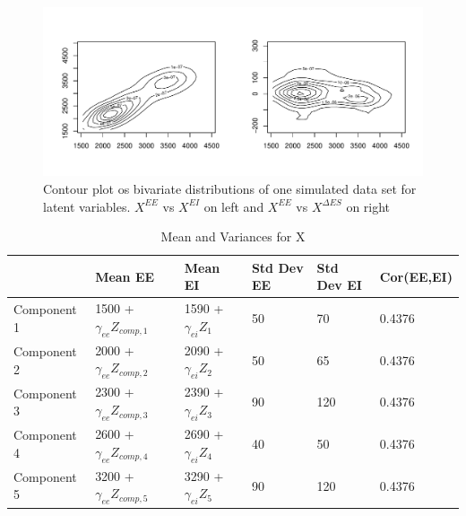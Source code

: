 \documentclass[11pt]{article}\usepackage[]{graphicx}\usepackage[]{color}
\makeatletter
\def\maxwidth{ %
  \ifdim\Gin@nat@width>\linewidth
    \linewidth
  \else
    \Gin@nat@width
  \fi
}
\newenvironment{knitrout}{}{} %
\makeatother
\begin{document}
\begin{knitrout}
\color{fgcolor}\begin{figure}
\includegraphics[width=\maxwidth]{figure/contourx-1} \caption[Contour plot os bivariate distributions of one simulated data set for latent variables]{Contour plot os bivariate distributions of one simulated data set for latent variables. $X^{EE}$ vs $X^{EI}$ on left and $X^{EE}$ vs $X^{\Delta ES}$ on right}\label{fig:contourx}
\end{figure}


\end{knitrout}


\begin{table}
  \begin{tabular}{l|lllll}
    \hline
    & Mean EE & Mean EI & Std Dev EE & Std Dev EI & Cor(EE,EI) \\
    \hline
    Component 1 & 1500 + $\gamma_{ee} Z_{comp,1}$ & 1590 + $\gamma_{ei} Z_1$ & 50 & 70 & 0.4376\\
    Component 2 & 2000 + $\gamma_{ee} Z_{comp,2}$ & 2090 + $\gamma_{ei} Z_2$ & 50 & 65 & 0.4376\\
    Component 3 & 2300 + $\gamma_{ee} Z_{comp,3}$ & 2390 + $\gamma_{ei} Z_3$ & 90 & 120 & 0.4376\\
    Component 4 & 2600 + $\gamma_{ee} Z_{comp,4}$ & 2690 + $\gamma_{ei} Z_4$ & 40 & 50 & 0.4376\\
    Component 5 & 3200 + $\gamma_{ee} Z_{comp,5}$ & 3290 + $\gamma_{ei} Z_5$ & 90 & 120 & 0.4376\\
    \hline
   \end{tabular}
\caption{Mean and Variances for X}
\label{xparams}
\end{table}
 

\end{document}
